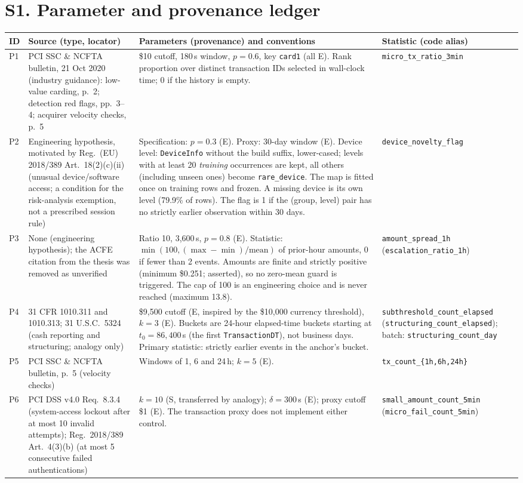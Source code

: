 \documentclass[10pt]{article}
\newcommand{\tf}[1]{\texttt{#1}}
\begin{document}
\section*{S1. Parameter and provenance ledger}
\footnotesize
\begin{tabular}{@{}l p{3.4cm} p{6.6cm} p{4.0cm}@{}}
\toprule
ID & Source (type, locator) & Parameters (provenance) and conventions & Statistic (code alias) \\
\midrule
P1 & PCI SSC \& NCFTA bulletin, 21 Oct 2020 (industry guidance): low-value carding, p.~2; detection red flags, pp.~3--4; acquirer velocity checks, p.~5 & \$10 cutoff, 180\,s window, $p=0.6$, key \tf{card1} (all E). Rank proportion over distinct transaction IDs selected in wall-clock time; 0 if the history is empty. & \tf{micro\_tx\_ratio\_3min} \\
P2 & Engineering hypothesis, motivated by Reg.\ (EU) 2018/389 Art.\ 18(2)(c)(ii) (unusual device/software access; a condition for the risk-analysis exemption, not a prescribed session rule) & Specification: $p=0.3$ (E). Proxy: 30-day window (E). Device level: \tf{DeviceInfo} without the build suffix, lower-cased; levels with at least 20 \emph{training} occurrences are kept, all others (including unseen ones) become \tf{rare\_device}. The map is fitted once on training rows and frozen. A missing device is its own level (79.9\% of rows). The flag is 1 if the (group, level) pair has no strictly earlier observation within 30 days. & \tf{device\_novelty\_flag} \\
P3 & None (engineering hypothesis); the ACFE citation from the thesis was removed as unverified & Ratio 10, 3,600\,s, $p=0.8$ (E). Statistic: $\min(100,(\max-\min)/\mathrm{mean})$ of prior-hour amounts, 0 if fewer than 2 events. Amounts are finite and strictly positive (minimum \$0.251; asserted), so no zero-mean guard is triggered. The cap of 100 is an engineering choice and is never reached (maximum 13.8). & \tf{amount\_spread\_1h} (\tf{escalation\_ratio\_1h}) \\
P4 & 31 CFR 1010.311 and 1010.313; 31 U.S.C.\ 5324 (cash reporting and structuring; analogy only) & \$9,500 cutoff (E, inspired by the \$10,000 currency threshold), $k=3$ (E). Buckets are 24-hour elapsed-time buckets starting at $t_0=86{,}400$\,s (the first \tf{TransactionDT}), not business days. Primary statistic: strictly earlier events in the anchor's bucket. & \tf{subthreshold\_count\_elapsed} (\tf{structuring\_count\_elapsed}); batch: \tf{structuring\_count\_day} \\
P5 & PCI SSC \& NCFTA bulletin, p.~5 (velocity checks) & Windows of 1, 6 and 24\,h; $k=5$ (E). & \tf{tx\_count\_\{1h,6h,24h\}} \\
P6 & PCI DSS v4.0 Req.\ 8.3.4 (system-access lockout after at most 10 invalid attempts); Reg.\ 2018/389 Art.\ 4(3)(b) (at most 5 consecutive failed authentications) & $k=10$ (S, transferred by analogy); $\delta=300$\,s (E); proxy cutoff \$1 (E). The transaction proxy does not implement either control. & \tf{small\_amount\_count\_5min} (\tf{micro\_fail\_count\_5min}) \\
\bottomrule
\end{tabular}
\normalsize
\end{document}

